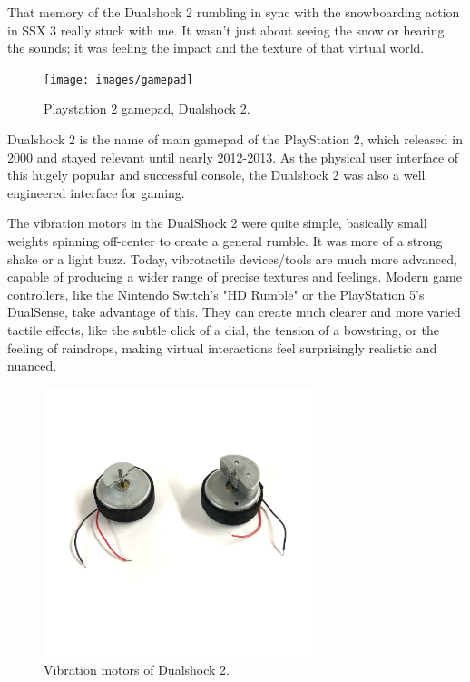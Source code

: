     That memory of the Dualshock 2 rumbling in sync with the snowboarding action in SSX 3 really stuck with me. It wasn't just about seeing the snow or hearing the sounds; it was feeling the impact and the texture of that virtual world.

    \begin{figure}[H]
    \centering
    \texttt{[image: images/gamepad]}
    \caption{Playstation 2 gamepad, Dualshock 2.}
    \label{fig:DS2}
    \end{figure}

    Dualshock 2 is the name of main gamepad of the PlayStation 2, which released in 2000 and stayed relevant until nearly 2012-2013. As the physical user interface of this hugely popular and successful console, the Dualshock 2 was also a well engineered interface for gaming.\par

    The vibration motors in the DualShock 2 were quite simple, basically small weights spinning off-center to create a general rumble. It was more of a strong shake or a light buzz\cite{PlayStation_Blogpost}. Today, vibrotactile devices/tools are much more advanced, capable of producing a wider range of precise textures and feelings. Modern game controllers, like the Nintendo Switch's "HD Rumble" or the PlayStation 5's DualSense, take advantage of this. They can create much clearer and more varied tactile effects, like the subtle click of a dial, the tension of a bowstring, or the feeling of raindrops, making virtual interactions feel surprisingly realistic and nuanced.

    \begin{figure}[H]
    \centering
    \includegraphics[width=0.7\textwidth]{images/vibration_motors_ds2}
    \caption{Vibration motors of Dualshock 2.}
    \label{fig:Vib_Motors}
    \end{figure}

